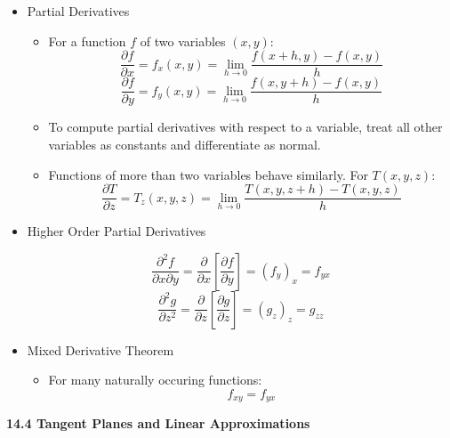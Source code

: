 \documentclass[12pt]{article}
\newcommand{\<}{\left<}
\renewcommand{\>}{\right>}
\newcommand{\p}{\partial}
\begin{document}
\begin{itemize}

  \item Partial Derivatives
    \begin{itemize}
      \item For a function $f$ of two variables $(x,y)$:
        \[\frac{\p f}{\p x}=f_x(x,y)=\lim_{h\to0}\frac{f(x+h,y)-f(x,y)}{h}\]
        \[\frac{\p f}{\p y}=f_y(x,y)=\lim_{h\to0}\frac{f(x,y+h)-f(x,y)}{h}\]
      \item To compute partial derivatives with respect to a variable, treat all other variables as constants and differentiate as normal.
      \item Functions of more than two variables behave similarly. For $T(x,y,z)$:
        \[\frac{\p T}{\p z}=T_z(x,y,z)=\lim_{h\to0}\frac{T(x,y,z+h)-T(x,y,z)}{h}\]
    \end{itemize}
    
  \item Higher Order Partial Derivatives

    \[
      \frac{\p^2 f}{\p x\p y} = \frac{\p}{\p x}\left[ \frac{\p f}{\p y} \right] = (f_y)_x = f_{yx}
    \] 
    \[
      \frac{\p^2 g}{\p z^2}= \frac{\p}{\p z}\left[ \frac{\p g}{\p z} \right]= (g_z)_z=g_{zz}
    \]
  
    \item Mixed Derivative Theorem 
      \begin{itemize}
      \item For many naturally occuring functions:
        \[f_{xy}=f_{yx}\]
      \end{itemize}
  
  

\end{itemize}

\newpage

\centerline{\bf 14.4 Tangent Planes and Linear Approximations}
\end{document}

